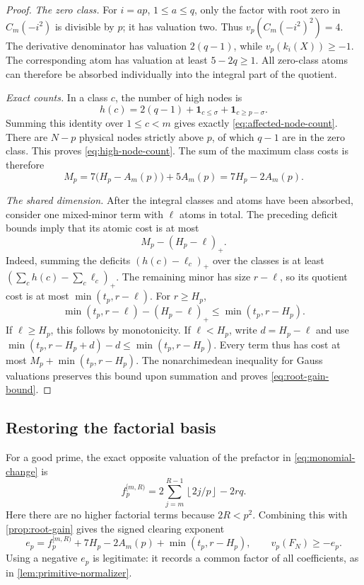\documentclass[11pt,letterpaper]{article}
\theoremstyle{definition}
\newcommand{\pos}[1]{\left(#1\right)_{+}}
\newcommand{\floor}[1]{\left\lfloor #1\right\rfloor}
\begin{document}
\begin{proof}
\emph{The zero class.}
For $i=ap$, $1\le a\le q$, only the factor with root zero in
$C_m(-i^2)$ is divisible by $p$; it has valuation two.
Thus $v_p(C_m(-i^2)^2)=4$. The derivative denominator has valuation
$2(q-1)$, while $v_p(k_i(X))\ge-1$. The corresponding atom has
valuation at least $5-2q\ge1$. All zero-class atoms can therefore
be absorbed individually into the integral part of the quotient.

\emph{Exact counts.}
In a class $c$, the number of high nodes is
\[
 h(c)=2(q-1)+\mathbf1_{c\le\sigma}+\mathbf1_{c\ge p-\sigma}.
\]
Summing this identity over $1\le c<m$ gives exactly
\eqref{eq:affected-node-count}. There are $N-p$ physical nodes
strictly above $p$, of which $q-1$ are in the zero class. This proves
\eqref{eq:high-node-count}. The sum of the maximum class costs is
therefore
\[
 M_p=7\bigl(H_p-A_m(p)\bigr)+5A_m(p)
     =7H_p-2A_m(p).
\]

\emph{The shared dimension.}
After the integral classes and atoms have been absorbed, consider
one mixed-minor term with $\ell$ atoms in total. The preceding
deficit bounds imply that its atomic cost is at most
\[
 M_p-\pos{H_p-\ell}.
\]
Indeed, summing the deficits $(h(c)-\ell_c)_+$ over the classes
is at least $(\sum_ch(c)-\sum_c\ell_c)_+$.
The remaining minor has size $r-\ell$, so its quotient cost is
at most $\min(t_p,r-\ell)$. For $r\ge H_p$,
\[
 \min(t_p,r-\ell)-\pos{H_p-\ell}
 \le\min(t_p,r-H_p).
\]
If $\ell\ge H_p$, this follows by monotonicity. If $\ell<H_p$,
write $d=H_p-\ell$ and use
$\min(t_p,r-H_p+d)-d\le\min(t_p,r-H_p)$.
Every term thus has cost at most $M_p+\min(t_p,r-H_p)$.
The nonarchimedean inequality for Gauss valuations preserves this
bound upon summation and proves \eqref{eq:root-gain-bound}.
\end{proof}

\subsection{Restoring the factorial basis}
For a good prime, the exact opposite valuation of the prefactor in
\eqref{eq:monomial-change} is
\begin{equation}\label{eq:window-factorial-cost}
 f_p^{[m,R)}=2\sum_{j=m}^{R-1}\floor{2j/p}-2rq.
\end{equation}
Here there are no higher factorial terms because $2R<p^2$.
Combining this with \cref{prop:root-gain} gives the signed clearing
exponent
\begin{equation}\label{eq:upper-band-exponent}
 e_p=f_p^{[m,R)}+7H_p-2A_m(p)+\min(t_p,r-H_p),
 \qquad v_p(F_N)\ge-e_p.
\end{equation}
Using a negative $e_p$ is legitimate: it records a common factor
of all coefficients, as in \cref{lem:primitive-normalizer}.
\end{document}
